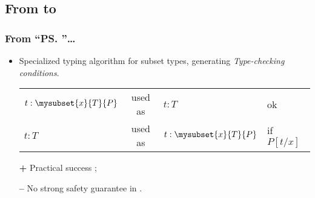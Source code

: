 \subsection{From \PVS to \Coq}
\begin{frame}
  \frametitle{From ``\ps''\ldots}
  
  \begin{block}{\PVS{}}
    \vspace{0.7em}
    \begin{itemize}
    \item Specialized typing algorithm for subset types, generating
      \emph{Type-checking conditions}.    
      \begin{tabular}{lcll}
        $t : \mysubset{x}{T}{P}$ & used as & $t : T$
        & ok \\
        $t : T$ & used as & $t : \mysubset{x}{T}{P}$ 
        & if $P[t/x]$
      \end{tabular}
      \pause
      
    \item[{\bf +}] Practical success ; \pause
    \item[{\bf --}] No strong safety guarantee in \PVS{}.
    \end{itemize}  
  \end{block}
\end{frame}

